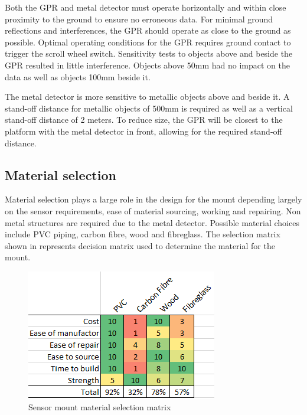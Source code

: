 \documentclass[main.tex]{subfiles}
\begin{document}
Both the GPR and metal detector must operate horizontally and within close proximity to the ground to ensure no erroneous data.
For minimal ground reflections and interferences, the GPR should operate as close to the ground as possible. Optimal operating conditions for the GPR requires ground contact to trigger the scroll wheel switch. Sensitivity tests to objects above and beside the GPR resulted in little interference. Objects above 50mm had no impact on the data as well as objects 100mm beside it. 

The metal detector is more sensitive to metallic objects above and beside it. A stand-off distance for metallic objects of 500mm is required as well as a vertical stand-off distance of 2 meters. To reduce size, the GPR will be closest to the platform with the metal detector in front, allowing for the required stand-off distance.  
\subsection {Material selection}  
Material selection plays a large role in the design for the mount depending largely on the sensor requirements, ease of material sourcing, working and repairing. Non metal structures are required due to the metal detector. Possible material choices include PVC piping, carbon fibre, wood and fibreglass. The selection matrix shown in  represents decision matrix used to determine the material for the mount.
\begin{figure}[ht]
\includegraphics[width = .5\textwidth]{4-ConceptDesign/Selection_criteria_materials.png}
\centering
\caption{Sensor mount material selection matrix} 
\end{figure}
\end{document}
